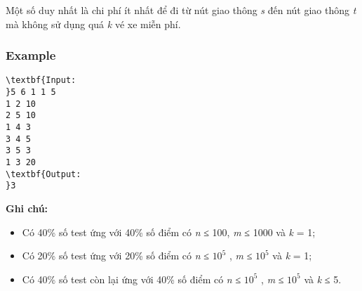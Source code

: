 Một số duy nhất là chi phí ít nhất để đi từ nút giao thông \emph{ s } đến nút giao thông \emph{ t } mà không sử dụng quá \emph{ k } vé xe miễn phí.

\subsubsection{Example}
\begin{verbatim}
\textbf{Input:
}5 6 1 1 5
1 2 10
2 5 10
1 4 3
3 4 5
3 5 3
1 3 20
\textbf{Output:
}3\end{verbatim}

\textbf{Ghi chú: }
\begin{itemize}
	\item Có 40\% số test ứng với 40\% số điểm có \emph{ n } ≤ 100, \emph{ m } ≤ 1000 và \emph{ k } = 1;
	\item Có 20\% số test ứng với 20\% số điểm có \emph{ n } ≤ $10^{5}$ , \emph{ m } ≤ $10^{5}$ và \emph{ k } = 1;
	\item Có 40\% số test còn lại ứng với 40\% số điểm có \emph{ n } ≤ $10^{5}$ , \emph{ m } ≤ $10^{5}$ và \emph{ k } ≤ 5.
\end{itemize}
